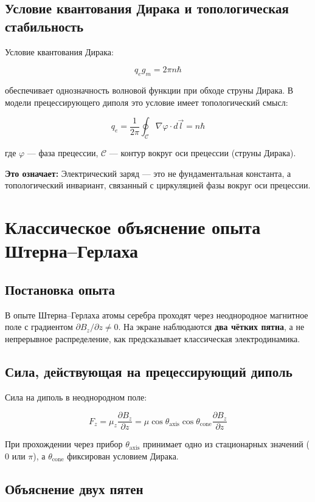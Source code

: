 \documentclass[12pt]{article}
\begin{document}
\subsection{Условие квантования Дирака и топологическая стабильность}

Условие квантования Дирака:

\[
q_e g_m = 2\pi n \hbar
\]

обеспечивает однозначность волновой функции при обходе струны Дирака. В модели прецессирующего диполя это условие имеет топологический смысл:

\[
q_e = \frac{1}{2\pi} \oint_{\mathcal{C}} \nabla\varphi \cdot d\vec{l} = n\hbar
\]

где $\varphi$ — фаза прецессии, $\mathcal{C}$ — контур вокруг оси прецессии (струны Дирака).

\textbf{Это означает:} Электрический заряд — это не фундаментальная константа, а топологический инвариант, связанный с циркуляцией фазы вокруг оси прецессии.

\section{Классическое объяснение опыта Штерна–Герлаха}

\subsection{Постановка опыта}

В опыте Штерна–Герлаха атомы серебра проходят через неоднородное магнитное поле с градиентом $\partial B_z / \partial z \neq 0$. На экране наблюдаются \textbf{два чётких пятна}, а не непрерывное распределение, как предсказывает классическая электродинамика.

\subsection{Сила, действующая на прецессирующий диполь}

Сила на диполь в неоднородном поле:

\[
F_z = \mu_z \frac{\partial B_z}{\partial z} = \mu \cos\theta_{\text{axis}} \cos\theta_{\text{cone}} \frac{\partial B_z}{\partial z}
\]

При прохождении через прибор $\theta_{\text{axis}}$ принимает одно из стационарных значений ($0$ или $\pi$), а $\theta_{\text{cone}}$ фиксирован условием Дирака.

\subsection{Объяснение двух пятен}
\end{document}

